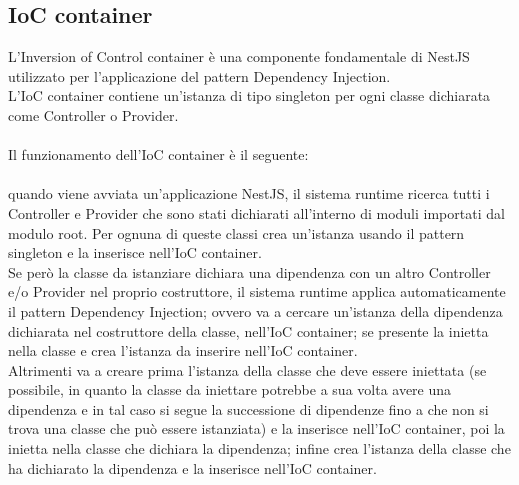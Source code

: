 \subsection{IoC container}
L'Inversion of Control container è una componente fondamentale di NestJS utilizzato per l'applicazione
del pattern Dependency Injection.
\\
L'IoC container contiene un'istanza di tipo singleton per ogni classe dichiarata come Controller o Provider.
\\\\
Il funzionamento dell'IoC container è il seguente:
\\\\
quando viene avviata un'applicazione NestJS, il sistema runtime ricerca tutti i Controller e Provider che 
sono stati dichiarati all'interno di moduli importati dal modulo root. Per ognuna di queste classi crea un'istanza
usando il pattern singleton e la inserisce nell'IoC container. 
\\
Se però la classe da istanziare dichiara una dipendenza con un altro Controller e/o Provider nel proprio 
costruttore, il sistema runtime applica automaticamente il pattern Dependency Injection; ovvero
va a cercare un'istanza della dipendenza dichiarata nel costruttore della classe, nell'IoC container; se
presente la inietta nella classe e crea l'istanza da inserire nell'IoC container. 
\\
Altrimenti va a creare prima
l'istanza della classe che deve essere iniettata (se possibile, in quanto la
classe da iniettare potrebbe a sua volta avere una dipendenza e in tal caso si segue la successione di 
dipendenze fino a che non si trova una classe che può essere istanziata) e la inserisce nell'IoC container, 
poi la inietta nella classe che dichiara
la dipendenza; infine crea l'istanza della classe che ha dichiarato la dipendenza e la inserisce nell'IoC container.
